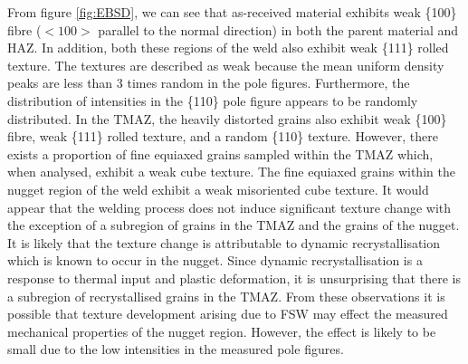 	From figure \ref{fig:EBSD}, we can see that as-received material exhibits weak \{100\} fibre ($<100>$ parallel to the normal direction) in both the parent material and HAZ. In addition, both these regions of the weld also exhibit weak \{111\} rolled texture. The textures are described as weak because the mean uniform density peaks are less than 3 times random in the pole figures. Furthermore, the distribution of intensities in the \{110\} pole figure appears to be randomly distributed. In the TMAZ, the heavily distorted grains also exhibit weak \{100\} fibre, weak \{111\} rolled texture, and a random \{110\} texture. However, there exists a proportion of fine equiaxed grains  sampled within the TMAZ which, when analysed, exhibit a weak cube texture. The fine equiaxed grains within the nugget region of the weld exhibit a weak misoriented cube texture. It would appear that the welding process does not induce significant texture change with the exception of a subregion of grains in the TMAZ and the grains of the nugget. It is likely that the texture change is attributable to dynamic recrystallisation which is known to occur in the nugget. Since dynamic recrystallisation is a response to thermal input and plastic deformation, it is unsurprising that there is a subregion of recrystallised grains in the TMAZ. From these observations it is possible that texture development arising due to FSW may effect the measured mechanical properties of the nugget region. However, the effect is likely to be small due to the low intensities in the measured pole figures. 
	
